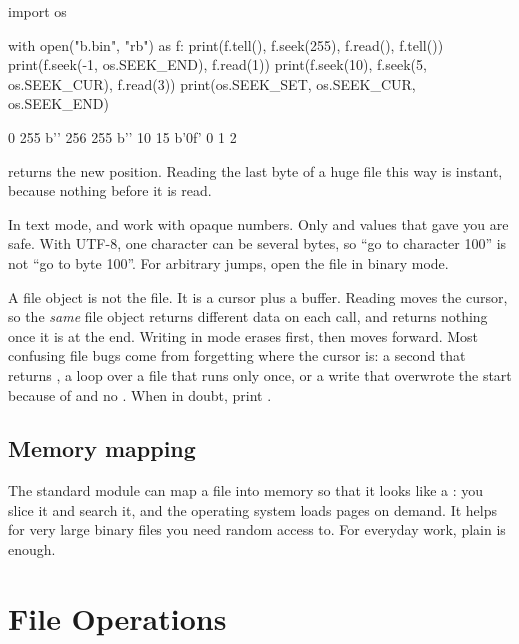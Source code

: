 \begin{pycode}
import os

with open("b.bin", "rb") as f:
    print(f.tell(), f.seek(255), f.read(), f.tell())
    print(f.seek(-1, os.SEEK_END), f.read(1))
    print(f.seek(10), f.seek(5, os.SEEK_CUR), f.read(3))
print(os.SEEK_SET, os.SEEK_CUR, os.SEEK_END)
\end{pycode}
\begin{rawcode}
0 255 b'\xff' 256
255 b'\xff'
10 15 b'\x0f'
0 1 2
\end{rawcode}

 returns the new position. Reading the last byte of a huge file this way is instant,
because nothing before it is read.

\begin{trap}
In text mode,  and  work with opaque numbers. Only  and values
that  gave you are safe. With UTF-8, one character can be several bytes, so ``go to
character 100'' is not ``go to byte 100''. For arbitrary jumps, open the file in binary mode.
\end{trap}

\begin{boss}
A file object is not the file. It is a cursor plus a buffer. Reading moves the cursor, so the
\emph{same} file object returns different data on each call, and returns nothing once it is at
the end. Writing in mode  erases first, then moves forward. Most confusing file bugs
come from forgetting where the cursor is: a second  that returns , a loop
over a file that runs only once, or a write that overwrote the start because of  and
no . When in doubt, print .
\end{boss}

\subsection{Memory mapping}

The standard  module can map a file into memory so that it looks like a
: you slice it and search it, and the operating system loads pages on demand.
It helps for very large binary files you need random access to. For everyday work, plain
 is enough.

\section{File Operations}

